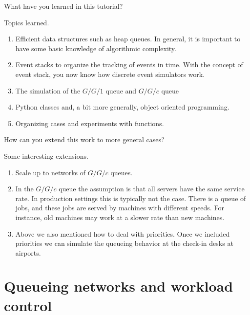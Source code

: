 \documentclass{scrartcl}
\begin{document}
\begin{exercise}
  What have you learned in this tutorial?
  \begin{solution}
    Topics learned.
    \begin{enumerate}
    \item Efficient data structures such as heap queues. In general, it is important to have some basic knowledge of algorithmic complexity. 
    \item Event stacks to organize the tracking of events in time. With the concept of event stack, you now know how discrete event simulators work. 
    \item The simulation of the $G/G/1$ queue and $G/G/c$ queue
    \item Python classes and, a bit more generally, object oriented programming. 
    \item Organizing cases and experiments with functions.
    \end{enumerate}
  \end{solution}
\end{exercise}

\begin{exercise}
 How can you extend this work to more general cases? 
  \begin{solution}
Some  interesting extensions.
    \begin{enumerate}
    \item   Scale up to networks of $G/G/c$ queues.
    \item In the $G/G/c$ queue the assumption is that all servers have the same service rate. In production settings this is typically not the case. There is a queue of jobs, and these jobs are served by machines with different speeds. For instance, old machines may work at a slower rate than new machines. 
    \item Above we also mentioned how to deal with priorities. Once we included priorities we can simulate the queueing behavior at the check-in desks at airports. 
    \end{enumerate}
  \end{solution}
\end{exercise}

\clearpage

\section{Queueing networks and workload control}
\label{sec:queueing-network}
\end{document}
